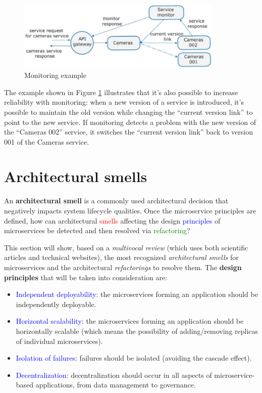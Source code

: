 \begin{figure} [H]
    \centering
    \includegraphics[width=0.88\textwidth]{images/Microservices/Monitor-example.PNG}
    \caption{Monitoring example}
    \label{fig:Monitor-example}
\end{figure} 

The example shown in Figure \ref{fig:Monitor-example} illustrates that it's also possible to increase reliability with monitoring: when a new version of a service is introduced, it's possible to maintain the old version while changing the “current version link” to point to the new service. If monitoring detects a problem with the new version of the “Cameras 002” service, it switches the “current version link” back to version 001 of the Cameras service.


\section{Architectural smells}

An \textbf{architectural smell} is a commonly used architectural decision that negatively impacts system lifecycle qualities. Once the microservice principles are defined, how can architectural \textcolor{red}{smells} affecting the design \textcolor{blue}{principles} of microservices be detected and then resolved via \textcolor{green}{refactoring}?

This section will show, based on a \textit{multivocal review} (which uses both scientific articles and technical websites), the most recognized \textit{architectural smells} for microservices and the architectural \textit{refactorings} to resolve them. \newline The \textbf{design principles} that will be taken into consideration are:

\begin{itemize}
    \item \textcolor{blue}{Independent deployability}: the microservices forming an application should be independently deployable.
    \item \textcolor{blue}{Horizontal scalability}: the microservices forming an application should be horizontally scalable (which means the possibility of adding/removing replicas of individual microservices).
    \item \textcolor{blue}{Isolation of failures}: failures should be isolated (avoiding the cascade effect).
    \item \textcolor{blue}{Decentralization}: decentralization should occur in all aspects of microservice-based applications, from data management to governance.
\end{itemize}

